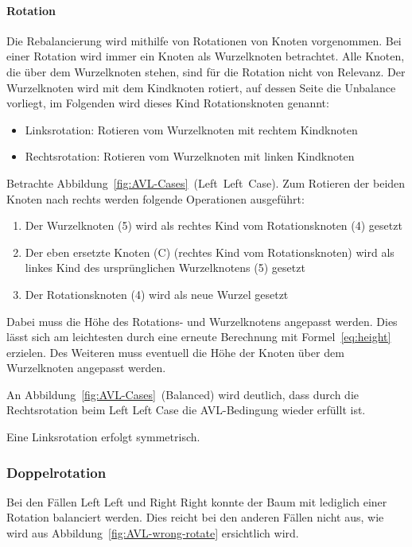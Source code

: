\paragraph*{Rotation}\label{par:rotating}

Die Rebalancierung wird mithilfe von Rotationen von Knoten vorgenommen.
Bei einer Rotation wird immer ein Knoten als Wurzelknoten betrachtet.
Alle Knoten, die über dem Wurzelknoten stehen, sind für die Rotation nicht von
Relevanz.
Der Wurzelknoten wird mit dem Kindknoten rotiert, auf dessen Seite die
Unbalance vorliegt, im Folgenden wird dieses Kind Rotationsknoten genannt:
\begin{itemize}
    \item Linksrotation: Rotieren vom Wurzelknoten mit rechtem Kindknoten
    \item Rechtsrotation: Rotieren vom Wurzelknoten mit linken Kindknoten
\end{itemize}
Betrachte Abbildung~\ref{fig:AVL-Cases}~(Left~Left~Case).
Zum Rotieren der beiden Knoten nach rechts werden folgende Operationen ausgeführt:
\begin{enumerate}
    \item Der Wurzelknoten (5) wird als rechtes Kind vom Rotationsknoten (4)
    gesetzt\label{enm:reblStep1}
    \item Der eben ersetzte Knoten (C) (rechtes Kind vom Rotationsknoten) wird als linkes Kind
    des ursprünglichen Wurzelknotens (5) gesetzt\label{enm:reblStep2}
    \item Der Rotationsknoten (4) wird als neue Wurzel gesetzt\label{enm:reblStep3}
\end{enumerate}
Dabei muss die Höhe des Rotations- und Wurzelknotens angepasst werden.
Dies lässt sich am leichtesten durch eine erneute Berechnung mit Formel~\ref{eq:height} erzielen.
Des Weiteren muss eventuell die Höhe der Knoten über dem Wurzelknoten angepasst werden.

An Abbildung~\ref{fig:AVL-Cases}~(Balanced) wird deutlich, dass durch die
Rechtsrotation beim Left Left Case die AVL-Bedingung wieder erfüllt ist.

Eine Linksrotation erfolgt symmetrisch.

\subsubsection{Doppelrotation}

Bei den Fällen Left Left und Right Right konnte der Baum mit lediglich
einer Rotation balanciert werden.
Dies reicht bei den anderen Fällen nicht aus, wie wird aus Abbildung~\ref{fig:AVL-wrong-rotate}
ersichtlich wird.

